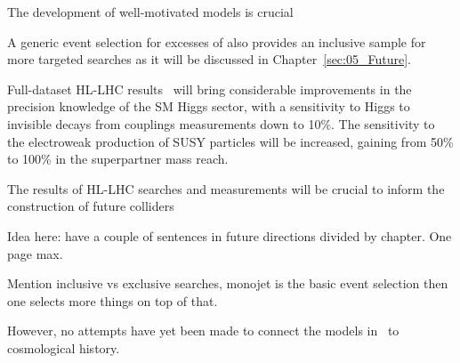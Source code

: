 
The development of well-motivated models is crucial 

A generic event selection for excesses of \MET also provides an inclusive sample for more targeted searches as it will be discussed in Chapter~\ref{sec:05_Future}. 

Full-dataset HL-LHC results~\cite{Campana:2016cqm} will bring considerable improvements in the precision knowledge of the SM Higgs sector, with a sensitivity to Higgs to invisible decays from couplings measurements down to 10\%. %
The sensitivity to the electroweak production of SUSY particles will be increased, gaining from 50\% to 100\% in the superpartner mass reach. %

The results of HL-LHC searches and measurements will be crucial to inform the construction of future colliders

\cite{Ilten:2016tkc} %
\cite{Ilten:2018crw} %
\cite{Golling:2016gvc} %
\cite{Liu:2017zdh} %


Idea here: have a couple of sentences in future directions divided by chapter. One page max. 

Mention inclusive vs exclusive searches, monojet is the basic event selection then one selects more things on top of that. 


However, no attempts have yet been made to connect the models in~\cite{Buchmueller:2017uqu} to cosmological history. 

